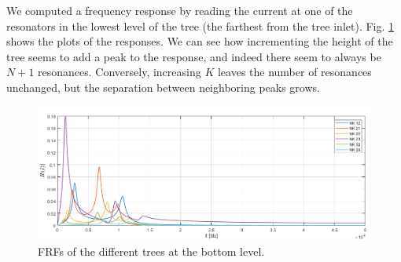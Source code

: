 \documentclass[a4paper]{article}
\begin{document}
We computed a frequency response by reading the current at one of the resonators in the lowest level of the tree (the farthest from the tree inlet). Fig. \ref{fig:es2} shows the plots of the responses. We can see how incrementing the height of the tree seems to add a peak to the response, and indeed there seem to always be $N+1$ resonances. Conversely, increasing $K$ leaves the number of resonances unchanged, but the separation between neighboring peaks grows.



\begin{figure}[h!]
	\centering
	\includegraphics[width=0.7\linewidth]{es2.png}
	\caption{FRFs of the different trees at the bottom level.}
	\label{fig:es2}
\end{figure}
\end{document}

